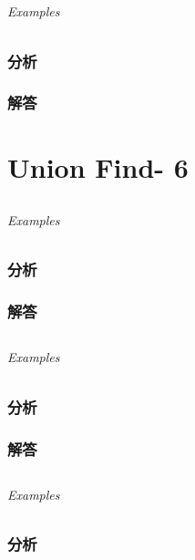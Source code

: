 \documentclass[UTF8,a4paper,12pt]{ctexbook}
\begin{document}
\section{}
	
	\subparagraph{Examples}
	
	\subsection{分析}
	
	\subsection{解答}
\chapter{Union Find- 6}	
\section{}
	
	\subparagraph{Examples}
	
	\subsection{分析}
	
	\subsection{解答}
	
\section{}
	
	\subparagraph{Examples}
	
	\subsection{分析}
	
	\subsection{解答}
	
	
\section{}
	
	\subparagraph{Examples}
	
	\subsection{分析}
	
\end{document}
